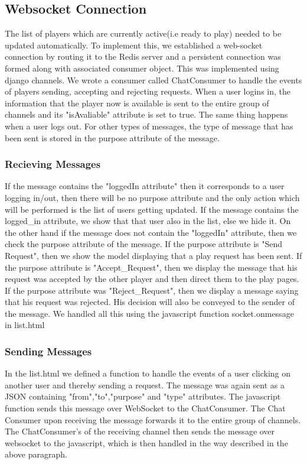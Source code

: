 \documentclass[titlepage]{article}
\begin{document}
\subsection{Websocket Connection}
The list of players which are currently active(i.e ready to play) needed to be updated automatically. To implement this, we established a web-socket connection by routing it to the Redis server and a persistent connection was formed along with associated consumer object. This was implemented using django channels. We wrote a consumer called ChatConsumer to handle the events of players sending, accepting and rejecting requests. When a user logins in, the information that the player now is available is sent to the entire group of channels and its "isAvaliable" attribute is set to true. The same thing happens when a user logs out. For other types of messages, the type of message that has been sent is stored in the purpose attribute of the message. 
\subsubsection{Recieving Messages}
If the message contains the "loggedIn attribute" then it corresponds to a user logging in/out, then there will be no purpose attribute and the only action which will be performed is the list of users getting updated. If the message contains the logged\_in attribute, we show that that user also in the list, else we hide it.  On the other hand if the message does not contain the "loggedIn" attribute, then we check the purpose attribute of the message. If the purpose attribute is "Send Request", then we show the model displaying that a play request has been sent. If the purpose attribute is "Accept\_Request", then we display the message that his request was accepted by the other player and then direct them to the play pages. If the purpose attribute was "Reject\_Request", then we display a message saying that his request was rejected.  His decision will also be conveyed to the sender of the message. We handled all this using the javascript function socket.onmessage in list.html

\subsubsection{Sending Messages}
In the list.html we defined a function to handle the events of a user clicking on another user and thereby sending a request. The message was again sent as a JSON containing "from","to","purpose" and "type" attributes. The javascript function sends this message over WebSocket to the ChatConsumer. The Chat Consumer upon receiving the message forwards it to the entire group of channels. The ChatConsumer's of the receiving channel then sends the message over websocket to the javascript, which is then handled in the way described in the above paragraph.
\end{document}
